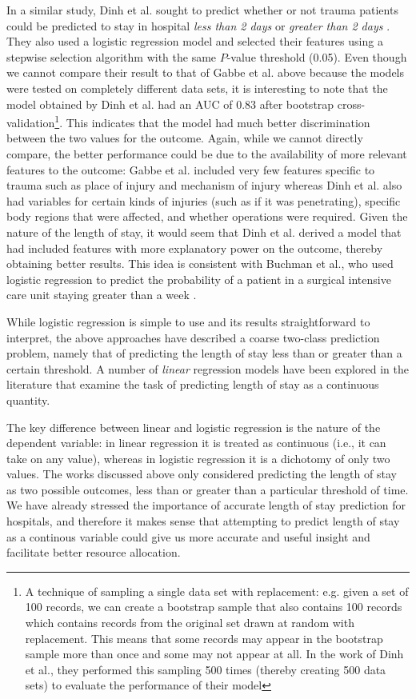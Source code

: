 In a similar study, Dinh et al. sought to predict whether or not trauma
patients could be predicted to stay in hospital \textit{less than 2 days} or
\textit{greater than 2 days} \citep{Dinh2013a}.
They also used a logistic regression model and
selected their features using a stepwise selection algorithm with the same
$P$-value threshold (0.05). Even though we cannot compare their result to that
of Gabbe et al. above because the models were tested on completely different
data sets, it is interesting to note that the model obtained by Dinh et al.
had an AUC of 0.83 after bootstrap cross-validation\footnote{A technique of
sampling a single data set with replacement: e.g. given a set of 100 records,
we can create a bootstrap sample that also contains 100 records which contains
records from the original set drawn at random with replacement. This means that
some records may appear in the bootstrap sample more than once and some may not
appear at all. In the work of Dinh et al., they performed this sampling 500
times (thereby creating 500 data sets) to evaluate the performance of their
model}. This indicates that the model had much better discrimination between
the two values for the outcome. Again, while we cannot directly compare, the
better performance could be due to the availability of more relevant features
to the outcome: Gabbe et al. included very few features specific to trauma
such as place of injury and mechanism of injury \citep{Gabbe2005} whereas Dinh
et al. also had variables for certain kinds of injuries (such as if it was
penetrating), specific body regions that were affected, and whether operations
were required. Given the nature of the length of stay, it would seem that Dinh
et al. derived a model that had included features with more explanatory power
on the outcome, thereby obtaining better results. This idea is consistent with
Buchman et al., who used logistic regression to predict the probability of a
patient in a surgical intensive care unit staying greater than a
week \citep{Buchman1994}.

While logistic regression is simple to use and its results straightforward
to interpret, the above approaches have described a coarse two-class prediction
problem, namely that of predicting the length of stay less than or greater than
a certain threshold. A number of \textit{linear} regression models have been
explored in the literature that examine the task of predicting length of stay
as a continuous quantity.

The key difference between linear and logistic regression is the nature of the
dependent variable: in linear regression it is treated as continuous (i.e., it
can take on any value), whereas in logistic regression it is a dichotomy of
only two values. The works discussed above only considered predicting the
length of stay as two possible outcomes, less than or greater than a particular
threshold of time. We have already stressed the importance of accurate length
of stay prediction for hospitals, and therefore it makes sense that attempting
to predict length of stay as a continous variable could give us more accurate
and useful insight and facilitate better resource allocation.

